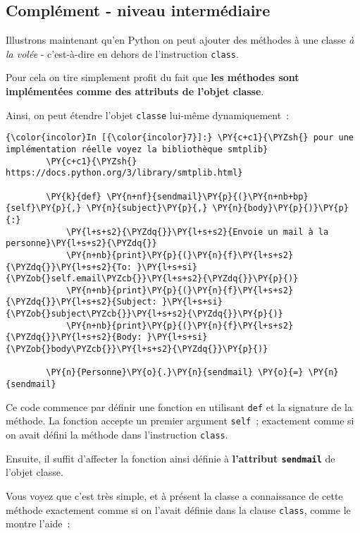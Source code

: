     \hypertarget{compluxe9ment---niveau-intermuxe9diaire}{%
\subsection{Complément - niveau
intermédiaire}\label{compluxe9ment---niveau-intermuxe9diaire}}

    Illustrons maintenant qu'en Python on peut ajouter des méthodes à une
classe \emph{à la volée} - c'est-à-dire en dehors de l'instruction
\texttt{class}.

Pour cela on tire simplement profit du fait que \textbf{les méthodes
sont implémentées comme des attributs de l'objet classe}.

    Ainsi, on peut étendre l'objet \texttt{classe} lui-même dynamiquement~:

    \begin{Verbatim}[commandchars=\\\{\}]
{\color{incolor}In [{\color{incolor}7}]:} \PY{c+c1}{\PYZsh{} pour une implémentation réelle voyez la bibliothèque smtplib}
        \PY{c+c1}{\PYZsh{} https://docs.python.org/3/library/smtplib.html}
        
        \PY{k}{def} \PY{n+nf}{sendmail}\PY{p}{(}\PY{n+nb+bp}{self}\PY{p}{,} \PY{n}{subject}\PY{p}{,} \PY{n}{body}\PY{p}{)}\PY{p}{:}
            \PY{l+s+s2}{\PYZdq{}}\PY{l+s+s2}{Envoie un mail à la personne}\PY{l+s+s2}{\PYZdq{}}
            \PY{n+nb}{print}\PY{p}{(}\PY{n}{f}\PY{l+s+s2}{\PYZdq{}}\PY{l+s+s2}{To: }\PY{l+s+si}{\PYZob{}self.email\PYZcb{}}\PY{l+s+s2}{\PYZdq{}}\PY{p}{)}
            \PY{n+nb}{print}\PY{p}{(}\PY{n}{f}\PY{l+s+s2}{\PYZdq{}}\PY{l+s+s2}{Subject: }\PY{l+s+si}{\PYZob{}subject\PYZcb{}}\PY{l+s+s2}{\PYZdq{}}\PY{p}{)}
            \PY{n+nb}{print}\PY{p}{(}\PY{n}{f}\PY{l+s+s2}{\PYZdq{}}\PY{l+s+s2}{Body: }\PY{l+s+si}{\PYZob{}body\PYZcb{}}\PY{l+s+s2}{\PYZdq{}}\PY{p}{)}
            
        \PY{n}{Personne}\PY{o}{.}\PY{n}{sendmail} \PY{o}{=} \PY{n}{sendmail}
\end{Verbatim}


    Ce code commence par définir une fonction en utilisant \texttt{def} et
la signature de la méthode. La fonction accepte un premier argument
\texttt{self}~; exactement comme si on avait défini la méthode dans
l'instruction \texttt{class}.

Ensuite, il suffit d'affecter la fonction ainsi définie à
\textbf{l'attribut \texttt{sendmail}} de l'objet classe.

Vous voyez que c'est très simple, et à présent la classe a connaissance
de cette méthode exactement comme si on l'avait définie dans la clause
\texttt{class}, comme le montre l'aide~:

